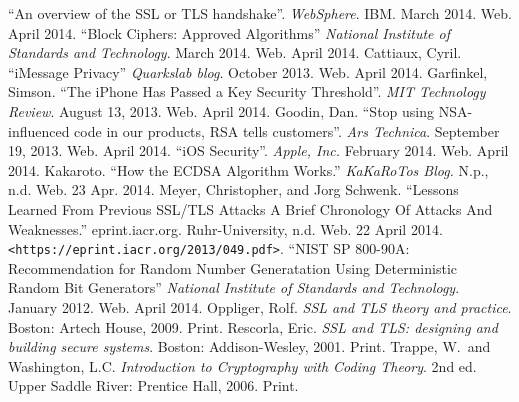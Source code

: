 \begin{thebibliography}{1}
 ``An overview of the SSL or TLS handshake''. \textit{WebSphere}. IBM. March 2014. Web. April 2014.
 ``Block Ciphers: Approved Algorithms'' \textit{National Institute of Standards and Technology}. March 2014. Web. April 2014.
 Cattiaux, Cyril. ``iMessage Privacy'' \textit{Quarkslab blog}. October 2013. Web. April 2014.
 Garfinkel, Simson. ``The iPhone Has Passed a Key Security Threshold''. \textit{MIT Technology Review}. August 13, 2013. Web. April 2014.
 Goodin, Dan. ``Stop using NSA-influenced code in our products, RSA tells customers''. \textit{Ars Technica}. September 19, 2013. Web. April 2014.
 ``iOS Security''. \textit{Apple, Inc.} February 2014. Web. April 2014.
 Kakaroto. ``How the ECDSA Algorithm Works.'' \textit{KaKaRoTos Blog.} N.p., n.d. Web. 23 Apr. 2014.
 Meyer, Christopher, and Jorg Schwenk. ``Lessons Learned From Previous SSL/TLS Attacks A Brief Chronology Of Attacks And Weaknesses.'' eprint.iacr.org. Ruhr-University, n.d. Web. 22 April 2014. \verb#<https://eprint.iacr.org/2013/049.pdf>#.
 ``NIST SP 800-90A: Recommendation for Random Number Generatation Using Deterministic Random Bit Generators'' \textit{National Institute of Standards and Technology}. January 2012. Web. April 2014.
 Oppliger, Rolf. \textit{SSL and TLS theory and practice}. Boston: Artech House, 2009. Print.
 Rescorla, Eric. \textit{SSL and TLS: designing and building secure systems}. Boston: Addison-Wesley, 2001. Print.
 Trappe, W.\ and Washington, L.C. \textit{Introduction to Cryptography with Coding Theory}. 2nd ed. Upper Saddle River: Prentice Hall, 2006. Print.
\end{thebibliography}
